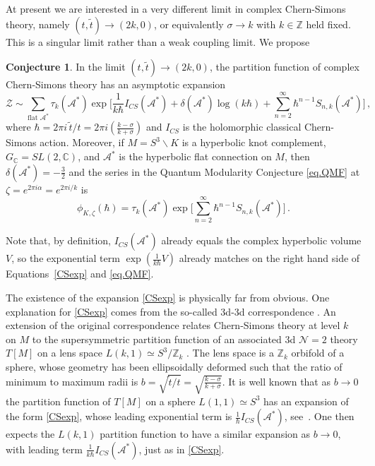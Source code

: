 \documentclass[12pt]{amsart}
\theoremstyle{definition}
\newtheorem{conjecture}[theorem]{Conjecture}
\def\calA{\mathcal A}
\def\d{\delta}
\def\be{  \begin{equation} }
\def\ee{  \end{equation} }
\newcommand{\C}{\mathbb{C}}
\newcommand{\Z}{\mathbb{Z}}
\begin{document}
At present we are interested in a very different limit in complex 
Chern-Simons theory, namely $(t,\tilde t) \to (2k,0)$, or equivalently 
$\sigma \to k$ with $k\in \Z$ held fixed. This is a singular limit rather 
than a weak coupling limit. We propose
%
\begin{conjecture}
\label{conj.CS}
In the limit $(t,\tilde t) \to (2k,0)$, the partition function of complex 
Chern-Simons theory has an asymptotic expansion
%
\be 
\label{CSexp} 
\mathcal Z \sim \sum_{\text{flat $\calA^*$}} 
\tau_k(\calA^*) \exp\bigg[\frac1{k\hbar}I_{CS}(\calA^*) 
+ \d(\calA^*)\log(k\hbar) + \sum_{n=2}^\infty \hbar^{n-1} 
S_{n,k}(\calA^*)\bigg]\,, 
\ee
%
where $\hbar = 2\pi i\, \tilde t/t= 2\pi i(\frac{k-\sigma}{k+\sigma})$ and
 $I_{CS}$ is the holomorphic classical Chern-Simons action. Moreover, if 
$M=S^3\backslash K$ is a hyperbolic knot complement, $G_\C=SL(2,\C)$, and 
$\calA^*$ is the hyperbolic flat connection on $M$, then 
$\d(\calA^*)=-\frac32$ and
the series in the Quantum Modularity Conjecture \eqref{eq.QMF} at 
$\zeta = e^{2\pi i\alpha} = e^{2\pi i/k}$ is
%
\be 
\label{CSmod} 
\phi_{K,\zeta}(\hbar) = \tau_k (\calA^*) 
\exp\bigg[\sum_{n=2}^\infty \hbar^{n-1} S_{n,k}(\calA^*)\bigg]\,.
\ee
%
\end{conjecture}
Note that, by definition, $I_{CS}(\calA^*)$ already equals the complex 
hyperbolic volume $V$, so the exponential term $\exp(\frac{1}{k\hbar}V)$ 
already matches on the right hand side of Equations~\eqref{CSexp} and 
\eqref{eq.QMF}.

The existence of the expansion \eqref{CSexp} is physically far from obvious. 
One explanation for \eqref{CSexp} comes from
the so-called 3d-3d correspondence \cite{Yamazaki-3d, DGG}. 
An extension of the original correspondence  relates 
Chern-Simons theory at level $k$ on $M$ to the supersymmetric partition 
function of an associated 3d $\mathcal N=2$ theory $T[M]$ on a lens space  
$L(k,1)\simeq S^3/\Z_k$ \cite{CJ, D-levelk}. The lens space is a $\Z_k$ 
orbifold of a 
sphere, whose geometry has been ellipsoidally deformed such that the ratio 
of minimum to maximum radii is $b=\sqrt{\tilde t/t} = 
\sqrt{\frac{k-\sigma}{k+\sigma}}$. It is well known that as $b\to 0$ the 
partition function of $T[M]$ on a sphere $L(1,1)\simeq S^3$ has an expansion 
of the form \eqref{CSexp}, whose leading exponential term is 
$\frac1\hbar I_{CS}(\calA^*)$, see~\cite{DG-Sdual, Yamazaki-3d, DGG}.
One then expects the $L(k,1)$ partition function to have a similar expansion 
as $b\to 0$, with leading term $\frac1{k\hbar} I_{CS}(\calA^*)$, just as in  
\eqref{CSexp}.
\end{document}
